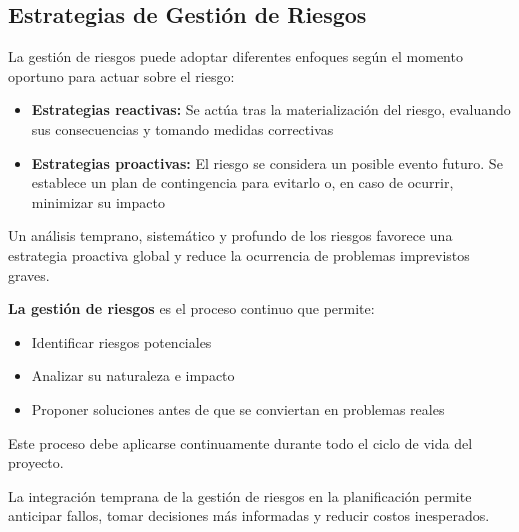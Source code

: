 \subsection{Estrategias de Gestión de Riesgos}\label{subsec:estrategias-de-gestion-de-riesgos}

La gestión de riesgos puede adoptar diferentes enfoques según el momento oportuno para actuar sobre el riesgo:

\begin{itemize}
    \item \textbf{Estrategias reactivas:} Se actúa tras la materialización del riesgo, evaluando sus consecuencias y tomando medidas correctivas

    \item \textbf{Estrategias proactivas:} El riesgo se considera un posible evento futuro.
    Se establece un plan de contingencia para evitarlo o, en caso de ocurrir, minimizar su impacto
\end{itemize}

Un análisis temprano, sistemático y profundo de los riesgos favorece una estrategia proactiva global y reduce la ocurrencia de problemas imprevistos graves.

\medskip

\textbf{La gestión de riesgos} es el proceso continuo que permite:

\begin{itemize}
    \item Identificar riesgos potenciales
    \item Analizar su naturaleza e impacto
    \item Proponer soluciones antes de que se conviertan en problemas reales
\end{itemize}

Este proceso debe aplicarse continuamente durante todo el ciclo de vida del proyecto.

\begin{nota}
    La integración temprana de la gestión de riesgos en la planificación permite anticipar fallos, tomar decisiones más informadas y reducir costos inesperados.
\end{nota}


